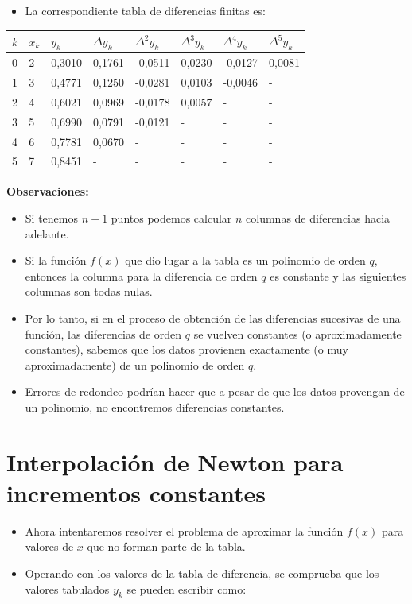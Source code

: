 \documentclass[]{book}
\providecommand{\tightlist}{%
  \setlength{\itemsep}{0pt}\setlength{\parskip}{0pt}}
\begin{document}
\begin{itemize}
\tightlist
\item
  La correspondiente tabla de diferencias finitas es:
\end{itemize}

\begin{longtable}[]{@{}llllllll@{}}
\toprule
\(k\) & \(x_k\) & \(y_k\) & \(\Delta y_k\) & \(\Delta^2 y_k\) & \(\Delta^3 y_k\) & \(\Delta^4 y_k\) & \(\Delta^5 y_k\)\tabularnewline
\midrule
\endhead
0 & 2 & 0,3010 & 0,1761 & -0,0511 & 0,0230 & -0,0127 & 0,0081\tabularnewline
1 & 3 & 0,4771 & 0,1250 & -0,0281 & 0,0103 & -0,0046 & -\tabularnewline
2 & 4 & 0,6021 & 0,0969 & -0,0178 & 0,0057 & - & -\tabularnewline
3 & 5 & 0,6990 & 0,0791 & -0,0121 & - & - & -\tabularnewline
4 & 6 & 0,7781 & 0,0670 & - & - & - & -\tabularnewline
5 & 7 & 0,8451 & - & - & - & - & -\tabularnewline
\bottomrule
\end{longtable}

\textbf{Observaciones:}

\begin{itemize}
\tightlist
\item
  Si tenemos \(n+1\) puntos podemos calcular \(n\) columnas de diferencias hacia adelante.
\item
  Si la función \(f(x)\) que dio lugar a la tabla es un polinomio de orden \(q\), entonces la columna para la diferencia de orden \(q\) es constante y las siguientes columnas son todas nulas.
\item
  Por lo tanto, si en el proceso de obtención de las diferencias sucesivas de una función, las diferencias de orden \(q\) se vuelven constantes (o aproximadamente constantes), sabemos que los datos provienen exactamente (o muy aproximadamente) de un polinomio de orden \(q\).
\item
  Errores de redondeo podrían hacer que a pesar de que los datos provengan de un polinomio, no encontremos diferencias constantes.
\end{itemize}

\hypertarget{interpolaciuxf3n-de-newton-para-incrementos-constantes}{%
\section{Interpolación de Newton para incrementos constantes}\label{interpolaciuxf3n-de-newton-para-incrementos-constantes}}

\begin{itemize}
\tightlist
\item
  Ahora intentaremos resolver el problema de aproximar la función \(f(x)\) para valores de \(x\) que no forman parte de la tabla.
\item
  Operando con los valores de la tabla de diferencia, se comprueba que los valores tabulados \(y_k\) se pueden escribir como:
\end{itemize}
\end{document}
